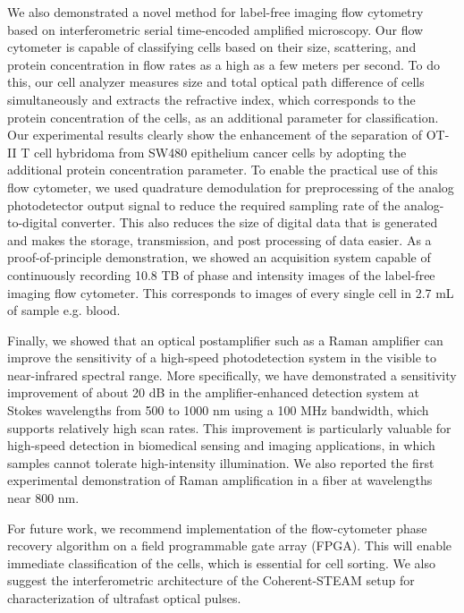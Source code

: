 We also demonstrated a novel method for label-free imaging flow cytometry based on interferometric serial time-encoded amplified microscopy. Our flow cytometer is capable of classifying cells based on their size, scattering, and protein concentration in flow rates as a high as a few meters per second. To do this, our cell analyzer measures size and total optical path difference of cells simultaneously and extracts the refractive index, which corresponds to the protein concentration of the cells, as an additional parameter for classification. Our experimental results clearly show the enhancement of the separation of OT-II T cell hybridoma from SW480 epithelium cancer cells by adopting the additional protein concentration parameter. To enable the practical use of this flow cytometer, we used quadrature demodulation for preprocessing of the analog photodetector output signal to reduce the required sampling rate of the analog-to-digital converter. This also reduces the size of digital data that is generated and makes the storage, transmission, and post processing of data easier. As a proof-of-principle demonstration, we showed an acquisition system capable of continuously recording 10.8 TB of phase and intensity images of the label-free imaging flow cytometer. This corresponds to images of every single cell in 2.7 mL of sample e.g. blood. 

Finally, we showed that an optical postamplifier such as a Raman amplifier can improve the sensitivity of a high-speed photodetection system in the visible to near-infrared spectral range. More specifically, we have demonstrated a sensitivity improvement of about 20 dB in the amplifier-enhanced detection system at Stokes wavelengths from 500 to 1000 nm using a 100 MHz bandwidth, which supports relatively high scan rates. This improvement is particularly valuable for high-speed detection in biomedical sensing and imaging applications, in which samples cannot tolerate high-intensity illumination. We also reported the first experimental demonstration of Raman amplification in a fiber at wavelengths near 800 nm. 

For future work, we recommend implementation of the flow-cytometer phase recovery algorithm on a field programmable gate array (FPGA). This will enable immediate classification of the cells, which is essential for cell sorting. We also suggest the interferometric architecture of the Coherent-STEAM setup for characterization of ultrafast optical pulses. 